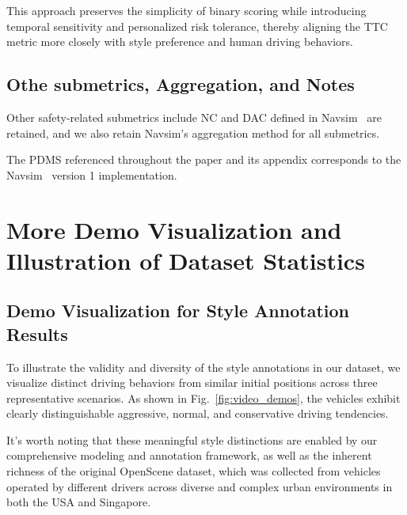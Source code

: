 \documentclass{article}
\begin{document}
This approach preserves the simplicity of binary scoring while introducing temporal sensitivity and personalized risk tolerance, thereby aligning the TTC metric more closely with style preference and human driving behaviors.

\subsection{Othe submetrics, Aggregation, and Notes}

Other safety-related submetrics include NC and DAC defined in Navsim~\cite{dauner2024navsim} are retained, and we also retain Navsim's aggregation method for all submetrics.

The PDMS referenced throughout the paper and its appendix corresponds to the Navsim~\cite{dauner2024navsim} version 1 implementation.

\section{More Demo Visualization and Illustration of Dataset Statistics}\label{sec: data_stat}

\subsection{Demo Visualization for Style Annotation Results}

To illustrate the validity and diversity of the style annotations in our dataset, we visualize distinct driving behaviors from similar initial positions across three representative scenarios. As shown in Fig.~\ref{fig:video_demos}, the vehicles exhibit clearly distinguishable aggressive, normal, and conservative driving tendencies. 

It's worth noting that these meaningful style distinctions are enabled by our comprehensive modeling and annotation framework, as well as the inherent richness of the original OpenScene dataset, which was collected from vehicles operated by different drivers across diverse and complex urban environments in both the USA and Singapore.
\end{document}

